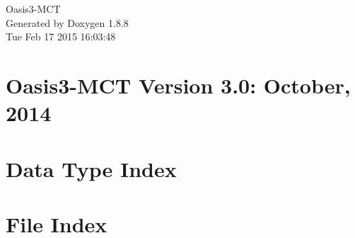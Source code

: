 \documentclass[twoside]{book}
\newcommand{\+}{\discretionary{\mbox{\scriptsize$\hookleftarrow$}}{}{}}
\newcommand{\clearemptydoublepage}{%
  \newpage{\pagestyle{empty}\cleardoublepage}%
}
\begin{document}
\hypersetup{pageanchor=false,
             bookmarks=true,
             bookmarksnumbered=true,
             pdfencoding=unicode
            }
\begin{titlepage}
\vspace*{7cm}
\begin{center}%
{\Large Oasis3-\/\+M\+C\+T }\\
\vspace*{1cm}
{\large Generated by Doxygen 1.8.8}\\
\vspace*{0.5cm}
{\small Tue Feb 17 2015 16:03:48}\\
\end{center}
\end{titlepage}
\clearemptydoublepage
\tableofcontents
\clearemptydoublepage
{}
\hypersetup{pageanchor=true}

\chapter{Oasis3-\/\+M\+C\+T Version 3.0\+: October, 2014}
\label{index}\hypertarget{index}{}
\chapter{Data Type Index}

\chapter{File Index}

\end{document}
